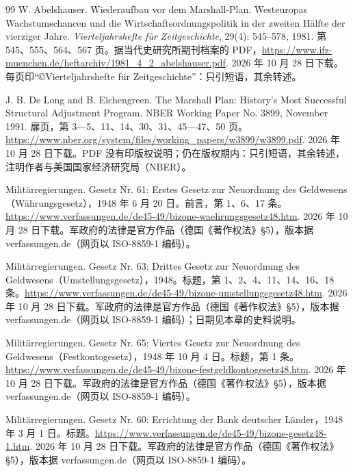 \begin{thebibliography}{99}
 W. Abelshauser. Wiederaufbau vor dem Marshall-Plan. Westeuropas Wachstumschancen und die Wirtschaftsordnungspolitik in der zweiten Hälfte der vierziger Jahre. \emph{Vierteljahrshefte für Zeitgeschichte}, 29(4): 545--578, 1981. 第 545、555、564、567 页。据当代史研究所期刊档案的 PDF，\url{https://www.ifz-muenchen.de/heftarchiv/1981_4_2_abelshauser.pdf}. 2026 年 10 月 28 日下载。每页印“©Vierteljahrshefte für Zeitgeschichte”：只引短语，其余转述。

 J. B. De Long and B. Eichengreen. The Marshall Plan: History's Most Successful Structural Adjustment Program. NBER Working Paper No. 3899, November 1991. 扉页，第 3—5、11、14、30、31、45—47、50 页。\url{https://www.nber.org/system/files/working_papers/w3899/w3899.pdf}. 2026 年 10 月 28 日下载。PDF 没有印版权说明；仍在版权期内：只引短语，其余转述，注明作者与美国国家经济研究局（NBER）。

 Militärregierungen. Gesetz Nr. 61: Erstes Gesetz zur Neuordnung des Geldwesens（Währungsgesetz），1948 年 6 月 20 日。前言，第 1、6、17 条。\url{https://www.verfassungen.de/de45-49/bizone-waehrungsgesetz48.htm}. 2026 年 10 月 28 日下载。军政府的法律是官方作品（德国《著作权法》§5），版本据 verfassungen.de（网页以 ISO-8859-1 编码）。

 Militärregierungen. Gesetz Nr. 63: Drittes Gesetz zur Neuordnung des Geldwesens（Umstellungsgesetz），1948。标题，第 1、2、4、11、14、16、18 条。\url{https://www.verfassungen.de/de45-49/bizone-umstellungsgesetz48.htm}. 2026 年 10 月 28 日下载。军政府的法律是官方作品（德国《著作权法》§5），版本据 verfassungen.de（网页以 ISO-8859-1 编码）；日期见本章的史料说明。

 Militärregierungen. Gesetz Nr. 65: Viertes Gesetz zur Neuordnung des Geldwesens（Festkontogesetz），1948 年 10 月 4 日。标题，第 1 条。\url{https://www.verfassungen.de/de45-49/bizone-festgeldkontogesetz48.htm}. 2026 年 10 月 28 日下载。军政府的法律是官方作品（德国《著作权法》§5），版本据 verfassungen.de（网页以 ISO-8859-1 编码）。

 Militärregierungen. Gesetz Nr. 60: Errichtung der Bank deutscher Länder，1948 年 3 月 1 日。标题。\url{https://www.verfassungen.de/de45-49/bizone-gesetz48-1.htm}. 2026 年 10 月 28 日下载。军政府的法律是官方作品（德国《著作权法》§5），版本据 verfassungen.de（网页以 ISO-8859-1 编码）。


\end{thebibliography}

